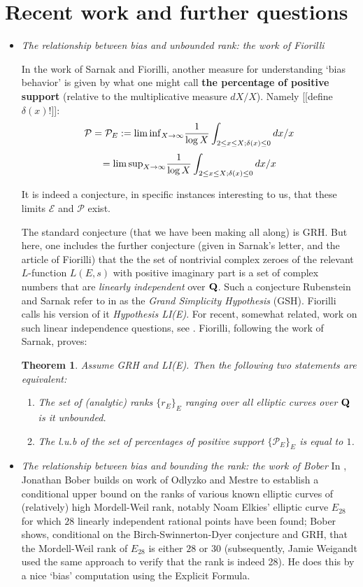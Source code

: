 \documentclass[11pt]{article}
\theoremstyle{plain}
\newtheorem{theorem}{Theorem}[section]
\theoremstyle{definition}
\numberwithin{equation}{section}
\numberwithin{figure}{section}
\numberwithin{table}{section}
\def\Q{\bf{Q}}
\begin{document}
\section{Recent work and further  questions}
\begin{itemize} \item {\it The relationship between bias and unbounded rank: the work of Fiorilli}\label{Fi}


In the work of Sarnak and Fiorilli, another measure for understanding `bias behavior' is given by what one might call {\bf the percentage of positive  support} (relative to the multiplicative measure $dX/X$). Namely [[define $\delta(x)$!]]:
$${\mathcal P} ={\mathcal P}_E:=  \lim {\rm inf}_{X\to \infty}{\frac{1}{\log X}}\int_{2\le x \le X; \delta(x)\le 0}dx/x$$
$$=   \lim {\rm sup}_{X\to \infty}{\frac{1}{\log X}}\int_{2\le x \le X; \delta(x)\le 0}dx/x$$
 \vskip20pt

  It is indeed a conjecture, in specific instances interesting to us, that these limits ${\mathcal E} $ and ${\mathcal P}$  exist.
   \vskip20pt

   The standard conjecture (that we have been making all along) is GRH. But here, one includes the further conjecture (given in Sarnak's letter, and the article of Fiorilli) that the the set of nontrivial complex zeroes of the relevant $L$-function $L(E,s)$ with positive imaginary part  is a set of complex numbers that are {\it linearly independent} over ${\Q}$. Such a conjecture Rubenstein and Sarnak refer to in \cite{R-S} as the {\it Grand Simplicity Hypothesis} (GSH).  Fiorilli calls his version of it  {\it Hypothesis LI(E)}.  For recent, somewhat related, work on such linear independence questions, see \cite{M-N}.   Fiorilli, following the work of Sarnak,  proves:

   \begin{theorem} Assume GRH and LI(E). Then the following two statements are equivalent:
   \begin{enumerate} \item  The set of (analytic) ranks $\{r_E\}_E$ ranging over all elliptic curves over ${\Q}$ is {it unbounded}.
   \item  The  l.u.b of the set of  {\it percentages of positive support}  $\{{\mathcal P}_E\}_E$ is equal to $1$.\end{enumerate}\end{theorem}
\item{\it The relationship between bias and bounding the rank: the
work of Bober}  In \cite{B}, Jonathan Bober  builds on work
of Odlyzko and Mestre to establish a conditional
upper bound on the ranks of various known elliptic curves of
(relatively) high Mordell-Weil rank, notably Noam Elkies'  elliptic
curve $E_{28}$ for which $28$ linearly independent rational points
have been found; Bober shows, conditional on the Birch-Swinnerton-Dyer
conjecture and GRH, that the Mordell-Weil rank of $E_{28}$ is either
$28$ or $30$ (subsequently, Jamie Weigandt used the same approach to
verify that the rank is indeed 28). He does this by a nice `bias'
computation using the
Explicit Formula.


\end{itemize}
\end{document}
